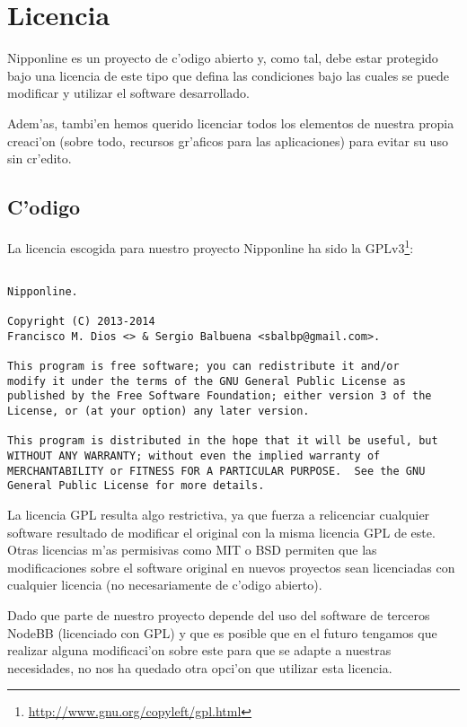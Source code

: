 \section{Licencia}
\label{sub:licencia}

Nipponline es un proyecto de c'odigo abierto y, como tal, debe estar protegido bajo una licencia de este tipo que 
defina las condiciones bajo las cuales se puede modificar y utilizar el software desarrollado.

Adem'as, tambi'en hemos querido licenciar todos los elementos de nuestra propia creaci'on (sobre todo, recursos gr'aficos 
para las aplicaciones) para evitar su uso sin cr'edito.

\subsection{C'odigo}
\label{sub:licencia_codigo}

La licencia escogida para nuestro proyecto Nipponline ha sido la GPLv3\footnote{\url{http://www.gnu.org/copyleft/gpl.html}}:

\begin{verbatim}

Nipponline.

Copyright (C) 2013-2014 
Francisco M. Dios <> & Sergio Balbuena <sbalbp@gmail.com>.

This program is free software; you can redistribute it and/or
modify it under the terms of the GNU General Public License as
published by the Free Software Foundation; either version 3 of the
License, or (at your option) any later version.

This program is distributed in the hope that it will be useful, but
WITHOUT ANY WARRANTY; without even the implied warranty of
MERCHANTABILITY or FITNESS FOR A PARTICULAR PURPOSE.  See the GNU
General Public License for more details.

\end{verbatim}

La licencia GPL resulta algo restrictiva, ya que fuerza a relicenciar cualquier software resultado de modificar el
original con la misma licencia GPL de este. Otras licencias m'as permisivas como MIT o BSD permiten que las 
modificaciones sobre el software original en nuevos proyectos sean licenciadas con cualquier licencia (no 
necesariamente de c'odigo abierto).

Dado que parte de nuestro proyecto depende del uso del software de terceros NodeBB (licenciado con GPL) y que es 
posible que en el futuro tengamos que realizar alguna modificaci'on sobre este para que se adapte a nuestras necesidades,
 no nos ha quedado otra opci'on que utilizar esta licencia.
 
